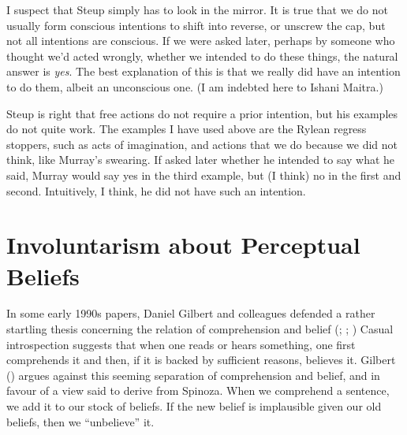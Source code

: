 \documentclass[
  11pt,
  letterpaper,
  DIV=11,
  numbers=noendperiod,
  oneside]{scrartcl}
\begin{document}
I suspect that Steup simply has to look in the mirror. It is true that
we do not usually form conscious intentions to shift into reverse, or
unscrew the cap, but not all intentions are conscious. If we were asked
later, perhaps by someone who thought we'd acted wrongly, whether we
intended to do these things, the natural answer is \emph{yes}. The best
explanation of this is that we really did have an intention to do them,
albeit an unconscious one. (I am indebted here to Ishani Maitra.)

Steup is right that free actions do not require a prior intention, but
his examples do not quite work. The examples I have used above are the
Rylean regress stoppers, such as acts of imagination, and actions that
we do because we did not think, like Murray's swearing. If asked later
whether he intended to say what he said, Murray would say yes in the
third example, but (I think) no in the first and second. Intuitively, I
think, he did not have such an intention.

\section{Involuntarism about Perceptual
Beliefs}\label{involuntarism-about-perceptual-beliefs}

In some early 1990s papers, Daniel Gilbert and colleagues defended a
rather startling thesis concerning the relation of comprehension and
belief (; ;
) Casual introspection suggests that when one reads or hears
something, one first comprehends it and then, if it is backed by
sufficient reasons, believes it. Gilbert
() argues against this seeming
separation of comprehension and belief, and in favour of a view said to
derive from Spinoza. When we comprehend a sentence, we add it to our
stock of beliefs. If the new belief is implausible given our old
beliefs, then we ``unbelieve'' it.
\end{document}
